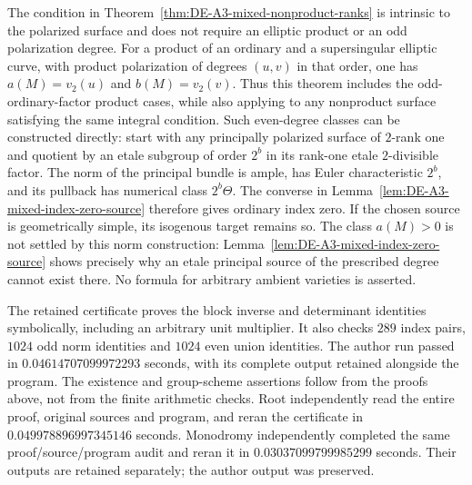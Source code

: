 \begin{remark}
\label{rem:DE-A3-mixed-nonproduct-scope}
The condition in Theorem~\ref{thm:DE-A3-mixed-nonproduct-ranks}
is intrinsic to the polarized surface and does not require an
elliptic product or an odd polarization degree.
For a product of an ordinary and a supersingular elliptic curve,
with product polarization of degrees $(u,v)$ in that order,
one has $a(M)=v_2(u)$ and $b(M)=v_2(v)$.
Thus this theorem includes the odd-ordinary-factor product cases,
while also applying to any nonproduct surface satisfying the
same integral condition.
Such even-degree classes can be constructed directly: start with
any principally polarized surface of $2$-rank one and quotient by
an etale subgroup of order $2^b$ in its rank-one etale
$2$-divisible factor.  The norm of the principal bundle is ample,
has Euler characteristic $2^b$, and its pullback has numerical
class $2^b\Theta$.  The converse in
Lemma~\ref{lem:DE-A3-mixed-index-zero-source} therefore gives
ordinary index zero.  If the chosen source is geometrically simple,
its isogenous target remains so.
The class $a(M)>0$ is not settled by this norm construction:
Lemma~\ref{lem:DE-A3-mixed-index-zero-source} shows precisely why
an etale principal source of the prescribed degree cannot exist
there.  No formula for arbitrary ambient varieties is asserted.

The retained certificate
proves the block inverse and determinant identities symbolically,
including an arbitrary unit multiplier.  It also checks $289$
index pairs, $1024$ odd norm identities and $1024$ even union identities.
The author run passed in $0.04614707099972293$ seconds, with its
complete output retained alongside the program.  The existence and
group-scheme assertions follow from the proofs above, not from the
finite arithmetic checks.
Root independently read the entire proof, original sources and program,
and reran the certificate in $0.049978896997345146$ seconds.
Monodromy independently completed the same proof/source/program audit
and reran it in $0.03037099799985299$ seconds.  Their outputs are retained
separately; the author output was preserved.
\end{remark}
